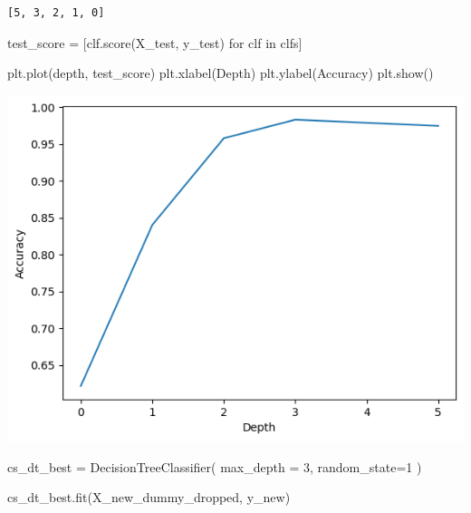 \documentclass[
  11pt,
  letterpaper,
  DIV=11,
  numbers=noendperiod]{scrartcl}
\newenvironment{Shaded}{\begin{snugshade}}{\end{snugshade}}
\newcommand{\ControlFlowTok}[1]{\textcolor[rgb]{0.00,0.23,0.31}{#1}}
\newcommand{\DecValTok}[1]{\textcolor[rgb]{0.68,0.00,0.00}{#1}}
\newcommand{\KeywordTok}[1]{\textcolor[rgb]{0.00,0.23,0.31}{#1}}
\newcommand{\NormalTok}[1]{\textcolor[rgb]{0.00,0.23,0.31}{#1}}
\newcommand{\OperatorTok}[1]{\textcolor[rgb]{0.37,0.37,0.37}{#1}}
\newcommand{\StringTok}[1]{\textcolor[rgb]{0.13,0.47,0.30}{#1}}
\begin{document}
\begin{verbatim}
[5, 3, 2, 1, 0]
\end{verbatim}

\begin{Shaded}
\begin{Highlighting}[]
\NormalTok{test\_score }\OperatorTok{=}\NormalTok{ [clf.score(X\_test, y\_test) }\ControlFlowTok{for}\NormalTok{ clf }\KeywordTok{in}\NormalTok{ clfs]}
\end{Highlighting}
\end{Shaded}

\begin{Shaded}
\begin{Highlighting}[]
\NormalTok{plt.plot(depth, test\_score)}
\NormalTok{plt.xlabel(}\StringTok{\textquotesingle{}Depth\textquotesingle{}}\NormalTok{)}
\NormalTok{plt.ylabel(}\StringTok{\textquotesingle{}Accuracy\textquotesingle{}}\NormalTok{)}
\NormalTok{plt.show()}
\end{Highlighting}
\end{Shaded}

\includegraphics{assignment6111_files/figure-pdf/cell-67-output-1.png}

\begin{Shaded}
\begin{Highlighting}[]
\NormalTok{cs\_dt\_best }\OperatorTok{=}\NormalTok{ DecisionTreeClassifier(}
\NormalTok{    max\_depth }\OperatorTok{=} \DecValTok{3}\NormalTok{, }
\NormalTok{    random\_state}\OperatorTok{=}\DecValTok{1}
\NormalTok{    ) }

\NormalTok{cs\_dt\_best.fit(X\_new\_dummy\_dropped, y\_new)}
\end{Highlighting}
\end{Shaded}
\end{document}
